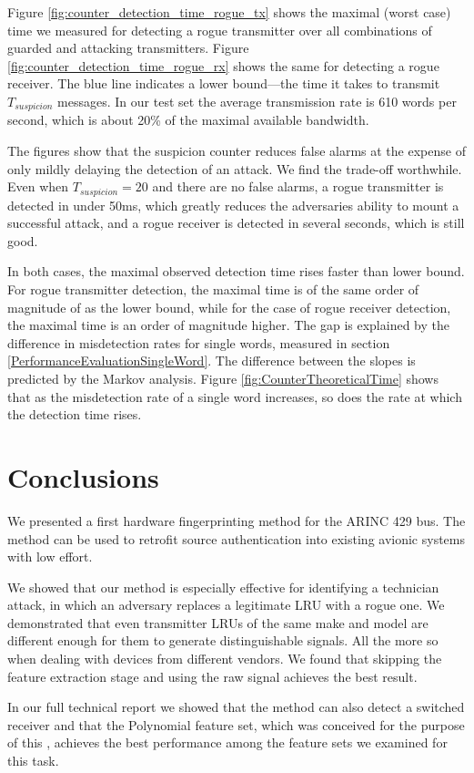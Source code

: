 \documentclass[english]{llncs}
\newcommand{\level}[1]{\section{#1}}
\newcommand{\level}[1]{\chapter{#1}}
\begin{document}
  Figure \ref{fig:counter_detection_time_rogue_tx} shows the maximal (worst case) time we measured for detecting a rogue transmitter over all combinations of guarded and attacking transmitters. Figure \ref{fig:counter_detection_time_rogue_rx} shows the same for detecting a rogue receiver. The blue line indicates a lower bound---the time it takes to transmit $T_{suspicion}$ messages. In our test set the average transmission rate is 610 words per second, which is about 20\% of the maximal available bandwidth.
  
  
  The figures show that the suspicion counter reduces false alarms at the expense of only mildly delaying the detection of an attack. We find the trade-off worthwhile. Even when $T_{suspicion} = 20$ and there are no false alarms, a rogue transmitter is detected in under 50ms, which greatly reduces the adversaries ability to mount a successful attack, and a rogue receiver is detected in several seconds, which is still good.
  
  In both cases, the maximal observed detection time rises faster than lower bound. For rogue transmitter detection, the maximal time is of the same order of magnitude of as the lower bound, while for the case of rogue receiver detection, the maximal time is an order of magnitude higher. The gap is explained by the difference in misdetection rates for single words, measured in section \ref{PerformanceEvaluationSingleWord}. The difference between the slopes is predicted by the Markov analysis. Figure \ref{fig:CounterTheoreticalTime} shows that as the misdetection rate of a single word increases, so does the rate at which the detection time rises.
  
\level{Conclusions} \label{Conclusions}
  We presented a first hardware fingerprinting method for the ARINC 429 bus. The method can be used to retrofit source authentication into existing avionic systems with low effort.
  
  We showed that our method is especially effective for identifying a technician attack, in which an adversary replaces a legitimate LRU with a rogue one. We demonstrated that even transmitter LRUs of the same make and model are different enough
  for them to generate distinguishable signals. All the more so when dealing with devices from different vendors. We found that skipping the feature extraction stage and using the raw signal achieves the best result.
  
  In our full technical report \cite{gilboa-markevich2020hardware} we showed that the method can also detect a switched receiver and that the Polynomial feature set, which was conceived for the purpose of this \iftoggle{paper} {paper} {work}, achieves the best performance among the feature sets we examined for this task.
\end{document}

